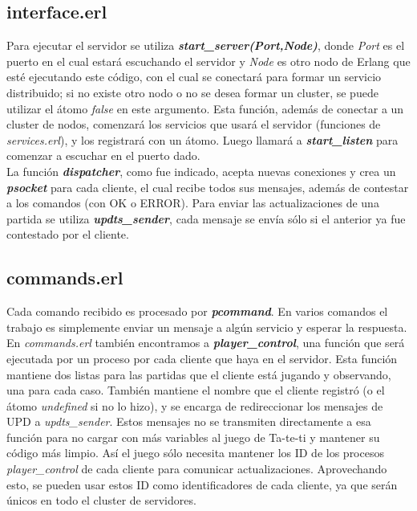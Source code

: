\documentclass[a4paper]{report}
\newcommand{\femph}[1]{\textbf{\textit{#1}}}
\begin{document}
\subsection*{interface.erl}
Para ejecutar el servidor se utiliza 
\femph{start\_server(Port,Node)}, donde \textit{Port} es el puerto
en el cual estará escuchando el servidor y \textit{Node} es otro nodo
de Erlang que esté ejecutando este c\'odigo, con el cual se
conectará para formar un servicio distribuido; si no existe otro nodo o no se
desea formar un cluster, se puede utilizar el átomo \textit{false} en este
argumento. Esta función, además de conectar a un cluster de nodos, comenzará
los servicios que usará el servidor (funciones de \textit{services.erl}), y 
los registrará con un átomo. Luego llamará a
\femph{start\_listen} para comenzar a escuchar en el puerto dado.\\
La función \femph{dispatcher}, como fue indicado, acepta nuevas conexiones y
crea un \femph{psocket} para cada cliente, el cual recibe todos sus 
mensajes, además de contestar a los comandos (con OK o ERROR). Para enviar
las actualizaciones de una partida se utiliza \femph{updts\_sender}, cada
mensaje se envía sólo si el anterior ya fue contestado por el cliente.

\subsection*{commands.erl}
Cada comando recibido es procesado por \femph{pcommand}. En varios
comandos el trabajo es simplemente enviar un mensaje a algún servicio y 
esperar la respuesta. En \textit{commands.erl} también encontramos a 
\femph{player\_control}, una función que será ejecutada por un proceso por
cada cliente que haya en el servidor. Esta función mantiene dos listas para
las partidas que el cliente está jugando y observando, una para cada caso.
También mantiene el nombre que el cliente registró (o el átomo 
\textit{undefined} si no lo hizo), y se encarga de redireccionar los mensajes
de UPD a \textit{updts\_sender}. Estos mensajes no se transmiten directamente
a esa función para no cargar con más variables al juego de Ta-te-ti y
mantener su código más limpio. Así el juego sólo necesita mantener los ID
de los procesos \textit{player\_control} de cada cliente para comunicar
actualizaciones. Aprovechando esto, se pueden usar estos ID como
identificadores de cada cliente, ya que serán únicos en todo el cluster de
servidores.
\end{document}
